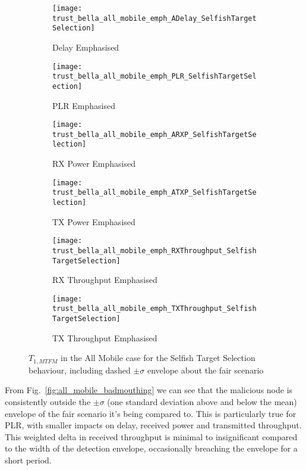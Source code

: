 \begin{figure}[h]
	\centering
	\begin{subfigure}{0.45\textwidth}	
	\caption{Delay Emphasised}
	\texttt{[image: trust\_bella\_all\_mobile\_emph\_ADelay\_SelfishTargetSelection]} 
	\label{fig:all_mobile_selfish_delay}
	\end{subfigure}
	\begin{subfigure}{0.45\textwidth}	
	\caption{PLR Emphasised}
	\texttt{[image: trust\_bella\_all\_mobile\_emph\_PLR\_SelfishTargetSelection]}
	\label{fig:all_mobile_selfish_plr}
	
	\end{subfigure}
	\begin{subfigure}{0.45\textwidth}	
	\caption{RX Power Emphasised}
	\texttt{[image: trust\_bella\_all\_mobile\_emph\_ARXP\_SelfishTargetSelection]}
	\label{fig:all_mobile_selfish_rxp}
	\end{subfigure}
	\begin{subfigure}{0.45\textwidth}
	\caption{TX Power Emphasised}
	\texttt{[image: trust\_bella\_all\_mobile\_emph\_ATXP\_SelfishTargetSelection]}
	\label{fig:all_mobile_selfish_txp}
	\end{subfigure}
	
	\begin{subfigure}{0.45\textwidth}
	\caption{RX Throughput Emphasised}
	\texttt{[image: trust\_bella\_all\_mobile\_emph\_RXThroughput\_SelfishTargetSelection]} 
	\label{fig:all_mobile_selfish_rxthroughput}
	\end{subfigure}
	\begin{subfigure}{0.45\textwidth}
	\caption{TX Throughput Emphasised}
	\texttt{[image: trust\_bella\_all\_mobile\_emph\_TXThroughput\_SelfishTargetSelection]} \label{fig:all_mobile_selfish_txthroughput}
	\end{subfigure}
	\caption{$T_{1,MTFM}$ in the All Mobile case for the Selfish Target Selection behaviour, including dashed $\pm\sigma$ envelope about the fair scenario}
	\label{fig:all_mobile_selfish}
\end{figure}

From Fig.~\ref{fig:all_mobile_badmouthing} we can see that the malicious node is consistently outside the $\pm\sigma$ (one standard deviation above and below the mean) envelope of the fair scenario it's being compared to.
This is particularly true for PLR, with smaller impacts on delay, received power and transmitted throughput. 
This weighted delta in received throughput is minimal to insignificant compared to the width of the detection envelope, occasionally breaching the envelope for a short period. 


